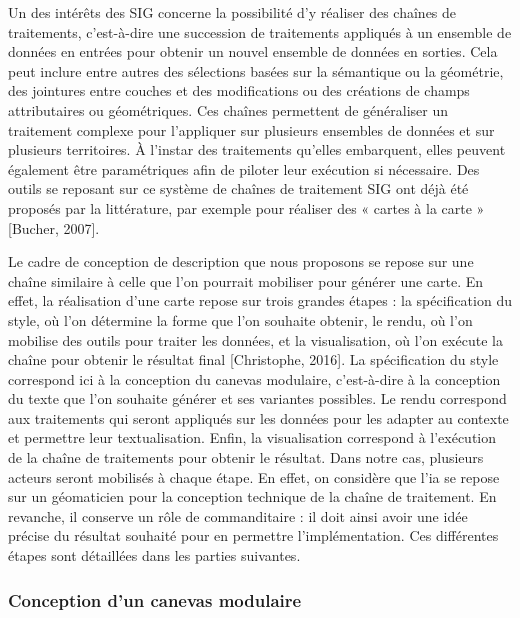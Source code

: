 \newpar{}

Un des intérêts des SIG concerne la possibilité d’y réaliser des chaînes de traitements, c’est-à-dire une succession de traitements appliqués à un ensemble de données en entrées pour obtenir un nouvel ensemble de données en sorties. Cela peut inclure entre autres des sélections basées sur la sémantique ou la géométrie, des jointures entre couches et des modifications ou des créations de champs attributaires ou géométriques. Ces chaînes permettent de généraliser un traitement complexe pour l’appliquer sur plusieurs ensembles de données et sur plusieurs territoires. À l’instar des traitements qu’elles embarquent, elles peuvent également être paramétriques afin de piloter leur exécution si nécessaire. Des outils se reposant sur ce système de chaînes de traitement SIG ont déjà été proposés par la littérature, par exemple pour réaliser des « cartes à la carte » [Bucher, 2007].

\newpar{}

Le cadre de conception de description que nous proposons se repose sur une chaîne similaire à celle que l’on pourrait mobiliser pour générer une carte. En effet, la réalisation d’une carte repose sur trois grandes étapes : la spécification du style, où l’on détermine la forme que l’on souhaite obtenir, le rendu, où l’on mobilise des outils pour traiter les données, et la visualisation, où l’on exécute la chaîne pour obtenir le résultat final [Christophe, 2016]. La spécification du style correspond ici à la conception du canevas modulaire, c’est-à-dire à la conception du texte que l’on souhaite générer et ses variantes possibles. Le rendu correspond aux traitements qui seront appliqués sur les données pour les adapter au contexte et permettre leur textualisation. Enfin, la visualisation correspond à l’exécution de la chaîne de traitements pour obtenir le résultat. Dans notre cas, plusieurs acteurs seront mobilisés à chaque étape. En effet, on considère que l’\gls{ia} se repose sur un géomaticien pour la conception technique de la chaîne de traitement. En revanche, il conserve un rôle de commanditaire : il doit ainsi avoir une idée précise du résultat souhaité pour en permettre l’implémentation. Ces différentes étapes sont détaillées dans les parties suivantes.

\subsubsection{Conception d'un canevas modulaire}

